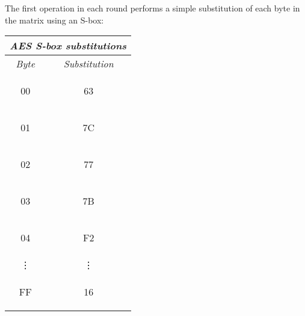 The first operation in each round performs a simple substitution of each byte
in the matrix using an S-box:
\begin{center}
\begin{tabular}{|c|c|} \hline
  \multicolumn{2}{|l|}{\textit{AES S-box substitutions}} \\ \hline\hline
  \textit{Byte} & \textit{Substitution} \\ \hline
  \begin{code}00\end{code} & \begin{code}63\end{code} \\
  \begin{code}01\end{code} & \begin{code}7C\end{code} \\
  \begin{code}02\end{code} & \begin{code}77\end{code} \\
  \begin{code}03\end{code} & \begin{code}7B\end{code} \\
  \begin{code}04\end{code} & \begin{code}F2\end{code} \\
  \vdots                   & \vdots \\
  \begin{code}FF\end{code} & \begin{code}16\end{code} \\ \hline
\end{tabular}\end{center}

